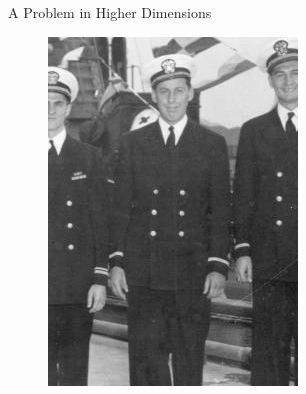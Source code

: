 \documentclass[12pt,t]{beamer}
\begin{document}
\begin{frame}{A Problem in Higher Dimensions}
\begin{figure}[!htb]
  \includegraphics[width=\linewidth]{Mairhuber-crop.jpg}
\endminipage\hfill
{}%

\end{figure}
\end{frame}
\end{document}
